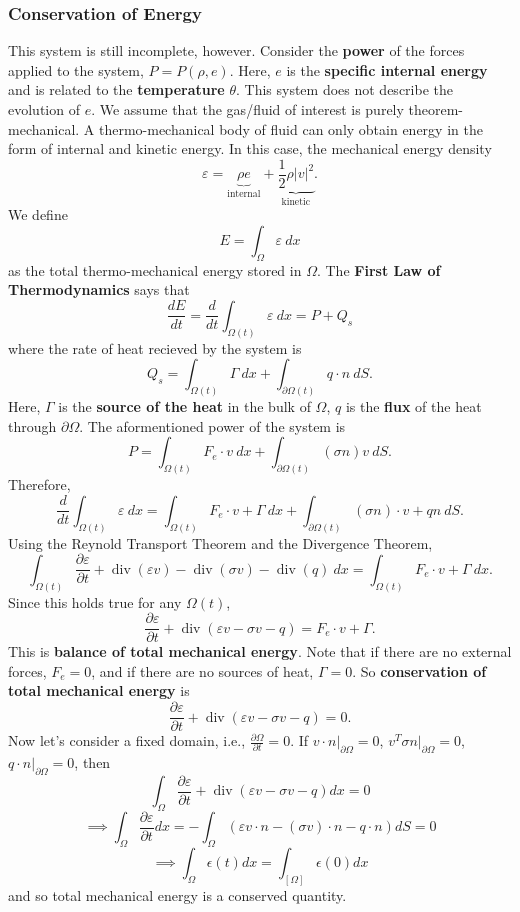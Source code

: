 \documentclass{article}
\theoremstyle{definition}
\theoremstyle{definition}
\begin{document}
\subsubsection{Conservation of Energy}
This system is still incomplete, however. Consider the \textbf{power} of the forces applied to the system, $P=P(\rho,e)$. Here, $e$ is the \textbf{specific internal energy} and is related to the \textbf{temperature} $\theta$. This system does not describe the evolution of $e$. We assume that the gas/fluid of interest is purely theorem-mechanical. A thermo-mechanical body of fluid can only obtain energy in the form of internal and kinetic energy. In this case, the mechanical energy density
$$\varepsilon=\underbrace{\rho e}_{\text{internal}}+\underbrace{\frac{1}{2}\rho |v|^2}_{\text{kinetic}}.$$
We define
$$E=\int_{\Omega}\varepsilon\:dx$$
as the total thermo-mechanical energy stored in $\Omega$. The \textbf{First Law of Thermodynamics} says that
$$\frac{dE}{dt}=\frac{d}{dt}\int_{\Omega(t)}\varepsilon\:dx=P+Q_s$$
where the rate of heat recieved by the system is
$$Q_s=\int_{\Omega(t)}\Gamma\:dx+\int_{\partial\Omega(t)}q\cdot n\:dS.$$
Here, $\Gamma$ is the \textbf{source of the heat} in the bulk of $\Omega$, $q$ is the \textbf{flux} of the heat through $\partial \Omega$.
The aformentioned power of the system is
$$P=\int_{\Omega(t)}F_e\cdot v\:dx+\int_{\partial \Omega(t)}(\sigma n)v\:dS.$$
Therefore,
$$\frac{d}{dt}\int_{\Omega(t)}\varepsilon\:dx=\int_{\Omega(t)}F_e\cdot v+\Gamma\:dx+\int_{\partial\Omega(t)}(\sigma n)\cdot v+qn\:dS.$$
Using the Reynold Transport Theorem and the Divergence Theorem,
$$\int_{\Omega(t)}\frac{\partial \varepsilon}{\partial t}+\operatorname{div}(\varepsilon v)-\operatorname{div}(\sigma v)-\operatorname{div}(q)\:dx=\int_{\Omega(t)}F_e\cdot v+\Gamma\:dx.$$
Since this holds true for any $\Omega(t)$,
$$\frac{\partial \varepsilon}{\partial t}+\operatorname{div}(\varepsilon v-\sigma v-q)=F_e\cdot v+\Gamma.$$
This is \textbf{balance of total mechanical energy}. Note that if there are no external forces, $F_e=0$, and if there are no sources of heat, $\Gamma=0$. So \textbf{conservation of total mechanical energy} is
$$\frac{\partial \varepsilon}{\partial t}+\operatorname{div}(\varepsilon v-\sigma v-q)=0.$$
Now let's consider a fixed domain, i.e., $\frac{\partial \Omega}{\partial t}=0$. If $v\cdot n|_{\partial \Omega}=0$, $v^T\sigma n|_{\partial \Omega}=0$, $q\cdot n|_{\partial \Omega}=0$, then
$$\int_{\Omega}\frac{\partial \varepsilon}{\partial t}+\operatorname{div}(\varepsilon v-\sigma v-q)dx=0$$
$$\implies \int_{\Omega}\frac{\partial \varepsilon}{\partial t}dx=-\int_{\Omega}(\varepsilon v\cdot n-(\sigma v)\cdot n-q\cdot n)dS=0$$
$$\implies \int_{\Omega}\epsilon(t)dx=\int_[\Omega]\epsilon(0)dx$$
and so total mechanical energy is a conserved quantity.
\end{document}
